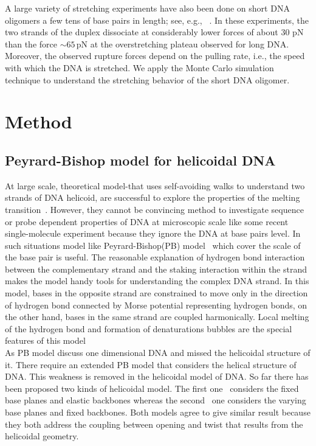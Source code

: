 \documentclass[12pt,masters,final]{UTRGVthesis}
\begin{document}
A large variety of stretching experiments have also been done on short DNA oligomers a few tens
of base pairs in length; see, e.g., 
~\cite{Strunz:1999, Pope:2001, Morfill:2007}.
In these experiments, the two strands of the duplex
dissociate at considerably lower forces of about 30 pN than the force $\sim 65$\,pN at the
overstretching plateau observed for long DNA. Moreover, the observed rupture forces depend
on the pulling rate, i.e., the speed with which the DNA is stretched. 
We apply the Monte Carlo simulation technique to understand the stretching behavior of the short DNA oligomer.
%
\newpage
\chapter{Method}
%
\section{Peyrard-Bishop model for helicoidal DNA}
At large scale, theoretical model-that uses self-avoiding walks to understand two strands of DNA helicoid, are successful to explore the properties of the melting transition~\cite{martin2000localization,kafri2000dna,carlon2002roles}. However, they cannot be convincing method to investigate sequence or probe dependent properties of DNA at microscopic scale like some recent single-molecule experiment because they ignore the DNA at base pairs level. In such situations model like Peyrard-Bishop(PB) model~\cite{peyrard1989statistical} which cover the scale of the base pair is useful. The reasonable explanation of hydrogen bond interaction between the complementary strand and the staking interaction within the strand makes the model handy tools for understanding the complex DNA strand. In this model, bases in the opposite strand are constrained to move only in the direction of hydrogen bond connected by Morse potential representing hydrogen bonds, on the other hand, bases in the same strand are coupled harmonically. Local melting of the hydrogen bond and formation of denaturations bubbles are the special features of this model\\
\indent
As PB model discuss one dimensional DNA and missed the helicoidal structure of it. There require an extended PB model that considers the helical structure of DNA. This weakness is removed in the helicoidal model of DNA. 
So far there has been proposed two kinds of helicoidal model. The first one~\cite{barbi2003thermal} considers the fixed base planes and elastic backbones whereas the second~\cite{cocco1999statistical} one considers the varying base planes and fixed backbones. Both models agree to give similar result because they both address the coupling between opening and twist that results from the helicoidal geometry.\\
\end{document}
